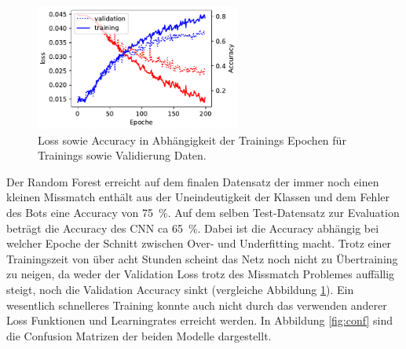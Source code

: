 \begin{figure}
		\vspace{-0.6cm}
		\centering
		\includegraphics[width=0.6\textwidth]{pictures/train_nn.pdf}
		\vspace{-1.2cm}
		\caption{Loss sowie Accuracy in Abhängigkeit der Trainings Epochen für
		Trainings sowie Validierung Daten.}
		\vspace{-0.2cm}
		\centering
		\label{fig:t_nn}
\end{figure}
Der Random Forest erreicht auf dem finalen Datensatz der immer noch einen
kleinen Missmatch enthält aus der Uneindeutigkeit der Klassen und dem Fehler
des Bots eine Accuracy von \SI{75}{\percent}. 
Auf dem selben Test-Datensatz zur Evaluation beträgt die Accuracy des CNN ca
\SI{65}{\percent}.
Dabei ist die Accuracy abhängig bei welcher Epoche der Schnitt zwischen Over-
und Underfitting macht.
Trotz einer Trainingszeit von über acht Stunden scheint das Netz noch nicht zu
Übertraining zu neigen, da weder der Validation Loss trotz des 
Missmatch Problemes auffällig steigt, noch die Validation Accuracy 
sinkt (vergleiche Abbildung \ref{fig:t_nn}).
Ein wesentlich schnelleres Training konnte auch nicht durch das verwenden 
anderer Loss Funktionen und Learningrates erreicht werden.
In Abbildung \ref{fig:conf} sind die Confusion Matrizen der beiden Modelle
dargestellt. 
